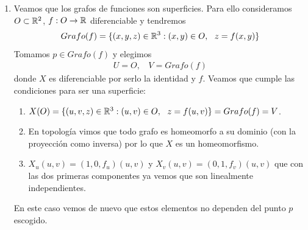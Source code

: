 \begin{ejemplo}
\begin{enumerate}
\begin{enumerate}
            \item Se tiene para todo $(u,v)\in U$:
            \begin{gather*}
                X_u(u,v) = (1,0,A)\\
                X_v(u,v) = (0,1,B)
            \end{gather*}
            y es fácil ver que son linealmente independientes (mirando las 2 primeras componentes de cada derivada parcial).
        \end{enumerate}
        \item Veamos que los grafos de funciones son superficies. Para ello consideramos $O\subset \mathbb{R}^2$, $f:O\to \mathbb{R}$ diferenciable y tendremos
        \begin{gather*}
            Grafo(f) = \{(x,y,z)\in \mathbb{R}^3:(x,y)\in O,\ \ z=f(x,y)\}
        \end{gather*}
        Tomamos $p\in Grafo(f)$ y elegimos
        \begin{gather*}
            U=O,\ \ \ \ V=Grafo(f)
        \end{gather*}
        donde $X$ es diferenciable por serlo la identidad y $f$. Veamos que cumple las condiciones para ser una superficie:
        \begin{enumerate}
            \item $X(O) = \{(u,v,z)\in \mathbb{R}^3 : (u,v)\in O,\ \ z=f(u,v)\} = Grafo(f) = V$.
            \item En topología vimos que todo grafo es homeomorfo a su dominio (con la proyección como inversa) por lo que $X$ es un homeomorfismo.
            \item $X_u(u,v) = (1,0,f_u)(u,v)$ y $X_v(u,v)=(0,1,f_v)(u,v)$ que con las dos primeras componentes ya vemos que son linealmente independientes.
        \end{enumerate}
        En este caso vemos de nuevo que estos elementos no dependen del punto $p$ escogido.



\end{enumerate}
\end{ejemplo}
